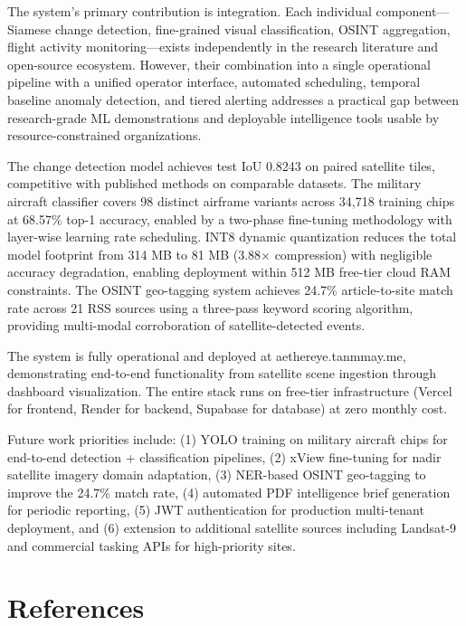 \documentclass[11pt,a4paper]{article}
\begin{document}
The system's primary contribution is integration. Each individual component---Siamese change detection, fine-grained visual classification, OSINT aggregation, flight activity monitoring---exists independently in the research literature and open-source ecosystem. However, their combination into a single operational pipeline with a unified operator interface, automated scheduling, temporal baseline anomaly detection, and tiered alerting addresses a practical gap between research-grade ML demonstrations and deployable intelligence tools usable by resource-constrained organizations.

The change detection model achieves test IoU 0.8243 on paired satellite tiles, competitive with published methods on comparable datasets. The military aircraft classifier covers 98 distinct airframe variants across 34,718 training chips at 68.57\% top-1 accuracy, enabled by a two-phase fine-tuning methodology with layer-wise learning rate scheduling. INT8 dynamic quantization reduces the total model footprint from 314 MB to 81 MB (3.88× compression) with negligible accuracy degradation, enabling deployment within 512 MB free-tier cloud RAM constraints. The OSINT geo-tagging system achieves 24.7\% article-to-site match rate across 21 RSS sources using a three-pass keyword scoring algorithm, providing multi-modal corroboration of satellite-detected events.

The system is fully operational and deployed at aethereye.tanmmay.me, demonstrating end-to-end functionality from satellite scene ingestion through dashboard visualization. The entire stack runs on free-tier infrastructure (Vercel for frontend, Render for backend, Supabase for database) at zero monthly cost.

Future work priorities include: (1) YOLO training on military aircraft chips for end-to-end detection + classification pipelines, (2) xView fine-tuning for nadir satellite imagery domain adaptation, (3) NER-based OSINT geo-tagging to improve the 24.7\% match rate, (4) automated PDF intelligence brief generation for periodic reporting, (5) JWT authentication for production multi-tenant deployment, and (6) extension to additional satellite sources including Landsat-9 and commercial tasking APIs for high-priority sites.

\hypertarget{references}{%
\section{References}\label{references}}
\end{document}
